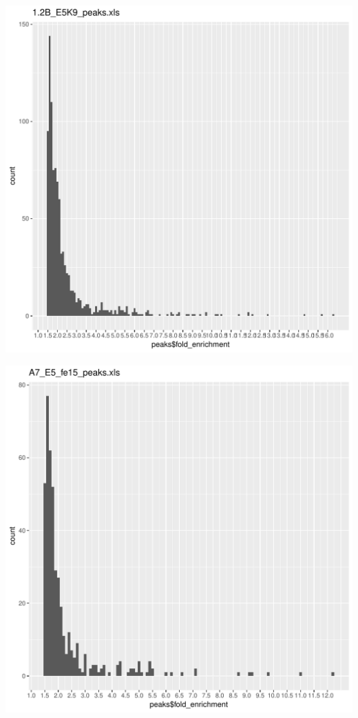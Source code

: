 \documentclass{article}\usepackage[]{graphicx}\usepackage[]{color}
\makeatletter
\def\maxwidth{ %
  \ifdim\Gin@nat@width>\linewidth
    \linewidth
  \else
    \Gin@nat@width
  \fi
}
\newenvironment{knitrout}{}{} %
\makeatother
\begin{document}
\begin{knitrout}
\includegraphics[width=\maxwidth]{figure/unnamed-chunk-2-8} 

\includegraphics[width=\maxwidth]{figure/unnamed-chunk-2-9} 


\end{knitrout}
\end{document}
